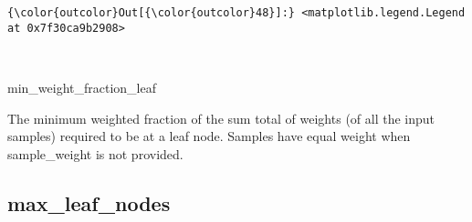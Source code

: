 \documentclass[11pt]{article}
\begin{document}
\begin{Verbatim}[commandchars=\\\{\}]
{\color{outcolor}Out[{\color{outcolor}48}]:} <matplotlib.legend.Legend at 0x7f30ca9b2908>
\end{Verbatim}
            
    \begin{center}
    \end{center}
    { \hspace*{\fill} \\}
    
    min\_weight\_fraction\_leaf

The minimum weighted fraction of the sum total of weights (of all the
input samples) required to be at a leaf node. Samples have equal weight
when sample\_weight is not provided.

    \subsection{max\_leaf\_nodes}\label{max_leaf_nodes}
\end{document}
